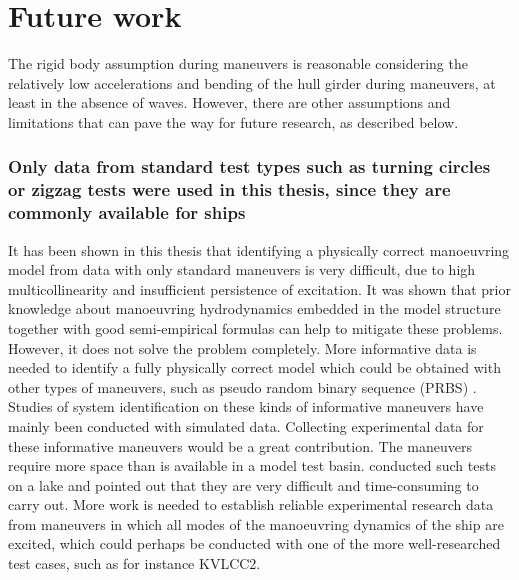 \chapter{Future work\label{ch:future_work}}

\noindent The rigid body assumption during maneuvers is reasonable considering the relatively low accelerations and bending of the hull girder during maneuvers, at least in the absence of waves. However, there are other assumptions and limitations that can pave the way for future research, as described below.

\subsection*{Only data from standard test types such as turning circles or zigzag tests were used in this thesis, since they are commonly available for ships}
It has been shown in this thesis that identifying a physically correct manoeuvring model from data with only standard maneuvers is very difficult, due to high multicollinearity and insufficient persistence of excitation. 
It was shown that prior knowledge about manoeuvring hydrodynamics embedded in the model structure together with good semi-empirical formulas can help to mitigate these problems.
However, it does not solve the problem completely. More informative data is needed to identify a fully physically correct model which could be obtained with other types of maneuvers, such as pseudo random binary sequence (PRBS) \cite{yoonIdentificationHydrodynamicCoefficients2003,wangOptimalDesignExcitation2020}. Studies of system identification on these kinds of informative maneuvers have mainly been conducted with simulated data. Collecting experimental data for these informative maneuvers would be a great contribution. The maneuvers require more space than is available in a model test basin. \textcite{millerShipModelIdentification2021} conducted such tests on a lake and pointed out that they are very difficult and time-consuming to carry out. 
More work is needed to establish reliable experimental research data from maneuvers in which all modes of the manoeuvring dynamics of the ship are excited, which could perhaps be conducted with one of the more well-researched test cases, such as for instance KVLCC2. 

